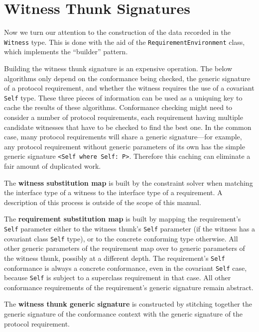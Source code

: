 \documentclass[a4paper,headsepline,bibliography=totoc,toc=flat,fleqn,twoside=semi]{scrbook}
\theoremstyle{definition}
\theoremstyle{definition}
\theoremstyle{definition}
\begin{document}
\section{Witness Thunk Signatures}\label{witnessthunksignature}

Now we turn our attention to the construction of the data recorded in the \texttt{Witness} type. This is done with the aid of the \texttt{RequirementEnvironment} class, which implements the ``builder'' pattern.

Building the witness thunk signature is an expensive operation. The below algorithms only depend on the conformance being checked, the generic signature of a protocol requirement, and whether the witness requires the use of a covariant \texttt{Self} type. These three pieces of information can be used as a uniquing key to cache the results of these algorithms. Conformance checking might need to consider a number of protocol requirements, each requirement having multiple candidate witnesses that have to be checked to find the best one. In the common case, many protocol requirements will share a generic signature---for example, any protocol requirement without generic parameters of its own has the simple generic signature \texttt{<Self where Self:\ P>}. Therefore this caching can eliminate a fair amount of duplicated work.

The \textbf{witness substitution map} is built by the constraint solver when matching the interface type of a witness to the interface type of a requirement. A description of this process is outside of the scope of this manual.

The \textbf{requirement substitution map} is built by mapping the requirement's \texttt{Self} parameter either to the witness thunk's \texttt{Self} parameter (if the witness has a covariant class \texttt{Self} type), or to the concrete conforming type otherwise. All other generic parameters of the requirement map over to generic parameters of the witness thunk, possibly at a different depth. The requirement's \texttt{Self} conformance is always a concrete conformance, even in the covariant \texttt{Self} case, because \texttt{Self} is subject to a superclass requirement in that case. All other conformance requirements of the requirement's generic signature remain abstract.

The \textbf{witness thunk generic signature} is constructed by stitching together the generic signature of the conformance context with the generic signature of the protocol requirement.
\end{document}
